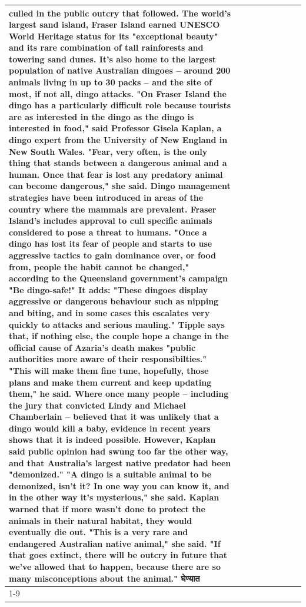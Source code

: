 \begin{table}[H]
\begin{tabular}{lllrlllll}
culled in the public outcry that followed. The world's largest sand island, Fraser Island earned UNESCO World Heritage status for its "exceptional beauty" and its rare combination of tall rainforests and towering sand dunes. It's also home to the largest population of native Australian dingoes -- around 200 animals living in up to 30 packs -- and the site of most, if not all, dingo attacks. "On Fraser Island the dingo has a particularly difficult role because tourists are as interested in the dingo as the dingo is interested in food," said Professor Gisela Kaplan, a dingo expert from the University of New England in New South Wales. "Fear, very often, is the only thing that stands between a dangerous animal and a human. Once that fear is lost any predatory animal can become dangerous," she said. Dingo management strategies have been introduced in areas of the country where the mammals are prevalent. Fraser Island's includes approval to cull specific animals considered to pose a threat to humans. "Once a dingo has lost its fear of people and starts to use aggressive tactics to gain dominance over, or food from, people the habit cannot be changed," according to the Queensland government's campaign "Be dingo-safe!" It adds: "These dingoes display aggressive or dangerous behaviour such as nipping and biting, and in some cases this escalates very quickly to attacks and serious mauling." Tipple says that, if nothing else, the couple hope a change in the official cause of Azaria's death makes "public authorities more aware of their responsibilties." "This will make them fine tune, hopefully, those plans and make them current and keep updating them," he said. Where once many people -- including the jury that convicted Lindy and Michael Chamberlain -- believed that it was unlikely that a dingo would kill a baby, evidence in recent years shows that it is indeed possible. However, Kaplan said public opinion had swung too far the other way, and that Australia's largest native predator had been "demonized." "A dingo is a suitable animal to be demonized, isn't it? In one way you can know it, and in the other way it's mysterious," she said. Kaplan warned that if more wasn't done to protect the animals in their natural habitat, they would eventually die out. "This is a very rare and endangered Australian native animal," she said. "If that goes extinct, there will be outcry in future that we've allowed that to happen, because there are so many misconceptions about the animal." घेण्यात \\
\cline{1-9}

\end{tabular}
\end{table}
